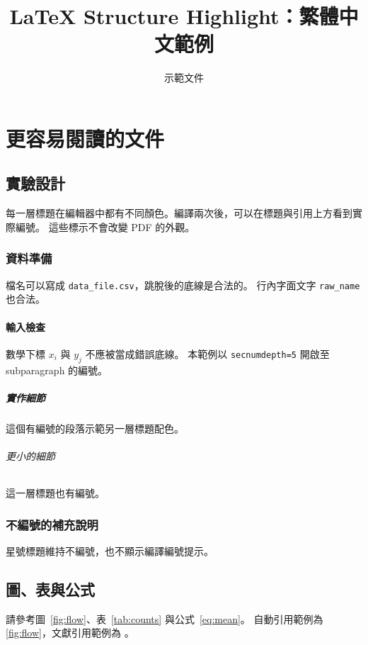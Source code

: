 \documentclass[UTF8,fontset=none,11pt]{ctexrep}
\title{LaTeX Structure Highlight：繁體中文範例}
\author{示範文件}
\date{}
\begin{document}
\maketitle
\tableofcontents
\chapter{更容易閱讀的文件}
\label{chap:overview}
\section{實驗設計}
\label{sec:design}
每一層標題在編輯器中都有不同顏色。編譯兩次後，可以在標題與引用上方看到實際編號。
這些標示不會改變 PDF 的外觀。

\subsection{資料準備}
\label{sec:data}
檔名可以寫成 \texttt{data\_file.csv}，跳脫後的底線是合法的。
行內字面文字 \verb|raw_name| 也合法。

\subsubsection{輸入檢查}
\label{sec:validation}
數學下標 $x_i$ 與 \(y_j\) 不應被當成錯誤底線。
本範例以 \texttt{secnumdepth=5} 開啟至 subparagraph 的編號。

\paragraph{實作細節}
\label{sec:implementation}
這個有編號的段落示範另一層標題配色。
\subparagraph{更小的細節}
\label{sec:detail}
這一層標題也有編號。
\subsection*{不編號的補充說明}
星號標題維持不編號，也不顯示編譯編號提示。

\section{圖、表與公式}
\label{sec:results}
請參考圖~\ref{fig:flow}、表~\ref{tab:counts} 與公式~\eqref{eq:mean}。
自動引用範例為 \autoref{fig:flow}，文獻引用範例為 \cite{sample2026}。
\end{document}
